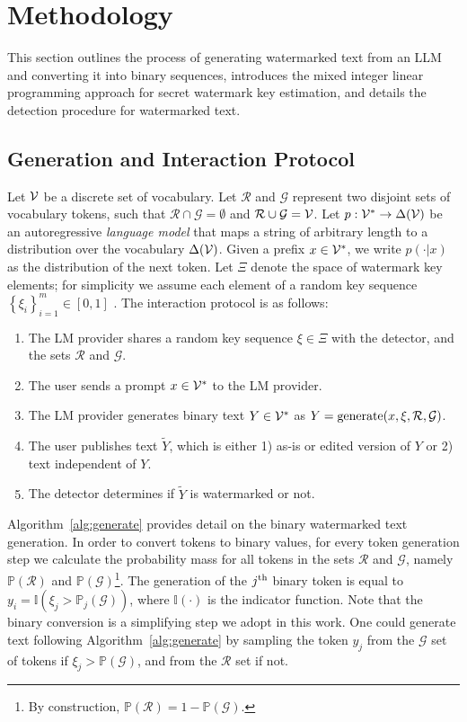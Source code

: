 \section{Methodology}
\label{sec:methodology}

This section outlines the process of generating watermarked text from an LLM and converting it into binary sequences, introduces the mixed integer linear programming approach for secret watermark key estimation, and details the detection procedure for watermarked text.

\subsection{Generation and Interaction Protocol}
\label{methodology}

Let $\mathcal{V}$ be a discrete set of vocabulary. Let $\mathcal{R}$ and $\mathcal{G}$ represent two disjoint sets of vocabulary tokens, such that $\mathcal{R} \cap \mathcal{G} = \emptyset$ and $\mathcal{R} \cup \mathcal{G} = \mathcal{V}$. Let $p: \mathcal{V}^* \rightarrow \Delta(\mathcal{V})$ be an autoregressive \emph{language model} that maps a string of arbitrary length to a distribution over the vocabulary $\Delta(\mathcal{V})$. Given a prefix $x \in \mathcal{V}^*$, we write $p(\cdot | x)$ as the distribution of the next token. Let $\Xi$ denote the space of watermark key elements; for simplicity we assume each element of a random key sequence $\left\{\xi_i\right\}_{i=1}^m \in [0,1]$ . The interaction protocol is as follows:
%
\begin{enumerate}
    \item The LM provider shares a random key sequence $\xi \in \Xi$ with the detector, and the sets $\mathcal{R}$ and $\mathcal{G}$. 
    \item The user sends a prompt $x \in \mathcal{V}^*$ to the LM provider.
    \item The LM provider generates binary text $Y \in \mathcal{V}^*$ as $Y = \mathrm{generate}(x, \xi, \mathcal{R}, \mathcal{G})$. 
    \item The user publishes text $\widetilde{Y}$, which is either 1) as-is or edited version of $Y$ or 2) text independent of $Y$.
    \item The detector determines if $\widetilde{Y}$ is watermarked or not.
\end{enumerate}
%

Algorithm~\ref{alg:generate} provides detail on the binary watermarked text generation. In order to convert tokens to binary values, for every token generation step we calculate the probability mass for all tokens in the sets $\mathcal{R}$  and $\mathcal{G}$, namely $\mathbb{P}(\mathcal{R})$ and $\mathbb{P}(\mathcal{G})$\footnote{By construction, $\mathbb{P}(\mathcal{R}) = 1 - \mathbb{P}(\mathcal{G})$.}. The generation of the $j^{\rm th}$ binary token is equal to $y_i = \mathbb{I}\left( \xi_j > \mathbb{P}_j(\mathcal{G}) \right)$, where $\mathbb{I}(\cdot)$ is the indicator function. Note that the binary conversion is a simplifying step we adopt in this work. One could generate text following Algorithm~\ref{alg:generate} by sampling the token $y_j$ from the $\mathcal{G}$ set of tokens if $\xi_j > \mathbb{P}(\mathcal{G})$, and from the $\mathcal{R}$ set if not.


